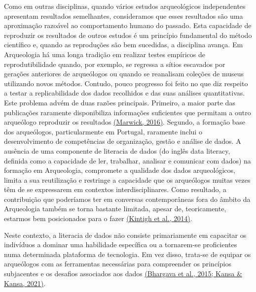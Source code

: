 \documentclass[
  letterpaper,
  DIV=11,
  numbers=noendperiod]{scrreprt}
\begin{document}
Como em outras disciplinas, quando vários estudos arqueológicos
independentes apresentam resultados semelhantes, consideramos que esses
resultados são uma aproximação razoável ao comportamento humano do
passado. Esta capacidade de reproduzir os resultados de outros estudos é
um princípio fundamental do método científico e, quando as reproduções
são bem sucedidas, a disciplina avança. Em Arqueologia há uma longa
tradição em realizar testes empíricos de reprodutibilidade quando, por
exemplo, se regressa a sítios escavados por gerações anteriores de
arqueólogos ou quando se reanalisam coleções de museus utilizando novos
métodos. Contudo, pouco progresso foi feito no que diz respeito a testar
a replicabilidade dos dados recolhidos e das suas análises
quantitativas. Este problema advém de duas razões principais. Primeiro,
a maior parte das publicações raramente disponibiliza informações
suficientes que permitam a outro arqueólogo reproduzir os resultados
\href{https://www.zotero.org/google-docs/?yfrWBb}{(Marwick, 2016)}.
Segundo, a formação base dos arqueólogos, particularmente em Portugal,
raramente inclui o desenvolvimento de competências de organização,
gestão e análise de dados. A ausência de uma componente de literacia de
dados (do inglês data literacy, definida como a capacidade de ler,
trabalhar, analisar e comunicar com dados) na formação em Arqueologia,
compromete a qualidade dos dados arqueológicos, limita a sua
reutilização e restringe a capacidade que os arqueólogos muitas vezes
têm de se expressarem em contextos interdisciplinares. Como resultado, a
contribuição que poderíamos ter em conversas contemporâneas fora do
âmbito da Arqueologia também se torna bastante limitada, apesar de,
teoricamente, estarmos bem posicionados para o fazer
\href{https://www.zotero.org/google-docs/?6ojXG9}{(Kintigh et al.,
2014)}.

Neste contexto, a literacia de dados não consiste primariamente em
capacitar os indivíduos a dominar uma habilidade específica ou a
tornarem-se proficientes numa determinada plataforma de tecnologia. Em
vez disso, trata-se de equipar os arqueólogos com as ferramentas
necessárias para compreender os princípios subjacentes e os desafios
associados aos dados
\href{https://www.zotero.org/google-docs/?NLzANX}{(Bhargava et al.,
2015; Kansa \& Kansa, 2021)}.~
\end{document}
